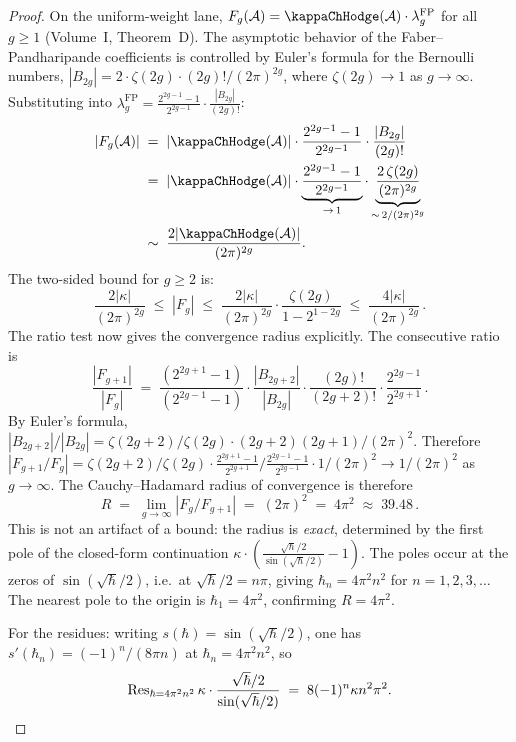 \begin{proof}
On the uniform-weight lane,
$F_g(\cA) = \kappaChHodge(\cA) \cdot \lambda_g^{\mathrm{FP}}$ for all $g \geq 1$
\textup{(}Volume~I, Theorem~D\textup{)}. The asymptotic behavior of
the Faber--Pandharipande coefficients is controlled by Euler's formula for the Bernoulli numbers,
$|B_{2g}| = 2 \cdot \zeta(2g) \cdot (2g)! / (2\pi)^{2g}$, where
$\zeta(2g) \to 1$ as $g \to \infty$. Substituting into $\lambda_g^{\mathrm{FP}} = \frac{2^{2g-1}-1}{2^{2g-1}} \cdot \frac{|B_{2g}|}{(2g)!}$:
\begin{align}
|F_g(\cA)| &\;=\; |\kappaChHodge(\cA)| \cdot \frac{2^{2g-1}-1}{2^{2g-1}} \cdot \frac{|B_{2g}|}{(2g)!} \notag \\
&\;=\; |\kappaChHodge(\cA)| \cdot \underbrace{\frac{2^{2g-1}-1}{2^{2g-1}}}_{\to\,1} \cdot \underbrace{\frac{2\,\zeta(2g)}{(2\pi)^{2g}}}_{\sim\,2/(2\pi)^{2g}} \notag \\
&\;\sim\; \frac{2|\kappaChHodge(\cA)|}{(2\pi)^{2g}}. %
\end{align}
The two-sided bound for $g \geq 2$ is:
\[
\frac{2|\kappa|}{(2\pi)^{2g}} \;\leq\; |F_g| \;\leq\; \frac{2|\kappa|}{(2\pi)^{2g}} \cdot \frac{\zeta(2g)}{1 - 2^{1-2g}} \;\leq\; \frac{4|\kappa|}{(2\pi)^{2g}}\,.
\]
The ratio test now gives the convergence radius explicitly. The consecutive ratio is
\[
\frac{|F_{g+1}|}{|F_g|}
\;=\;
\frac{(2^{2g+1}-1)}{(2^{2g-1}-1)}
\cdot
\frac{|B_{2g+2}|}{|B_{2g}|}
\cdot
\frac{(2g)!}{(2g+2)!}
\cdot
\frac{2^{2g-1}}{2^{2g+1}}\,.
\]
By Euler's formula, $|B_{2g+2}|/|B_{2g}| = \zeta(2g+2)/\zeta(2g) \cdot (2g+2)(2g+1)/(2\pi)^2$.
Therefore $|F_{g+1}/F_g| = \zeta(2g+2)/\zeta(2g) \cdot \frac{2^{2g+1}-1}{2^{2g+1}} / \frac{2^{2g-1}-1}{2^{2g-1}} \cdot 1/(2\pi)^2 \to 1/(2\pi)^2$ as $g \to \infty$. The Cauchy--Hadamard radius of convergence is therefore
\[
R \;=\; \lim_{g \to \infty} |F_g/F_{g+1}| \;=\; (2\pi)^2 \;=\; 4\pi^2 \;\approx\; 39.48\,.
\]
This is not an artifact of a bound: the radius is \emph{exact}, determined by the first pole of the closed-form continuation $\kappa \cdot (\frac{\sqrt{\hbar}/2}{\sin(\sqrt{\hbar}/2)} - 1)$. The poles occur at the zeros of $\sin(\sqrt{\hbar}/2)$,
i.e.\ at $\sqrt{\hbar}/2 = n\pi$, giving
$\hbar_n = 4\pi^2 n^2$ for $n = 1, 2, 3, \ldots$ The nearest pole to the origin is $\hbar_1 = 4\pi^2$, confirming $R = 4\pi^2$.

For the residues: writing $s(\hbar)=\sin(\sqrt{\hbar}/2)$, one
has $s'(\hbar_n)=(-1)^n/(8\pi n)$ at $\hbar_n = 4\pi^2 n^2$, so
\[
\operatorname{Res}_{\hbar = 4\pi^2 n^2}
\kappa \cdot \frac{\sqrt{\hbar}/2}{\sin(\sqrt{\hbar}/2)}
\;=\; 8(-1)^n \kappa n^2\pi^2.
\]
\end{proof}

